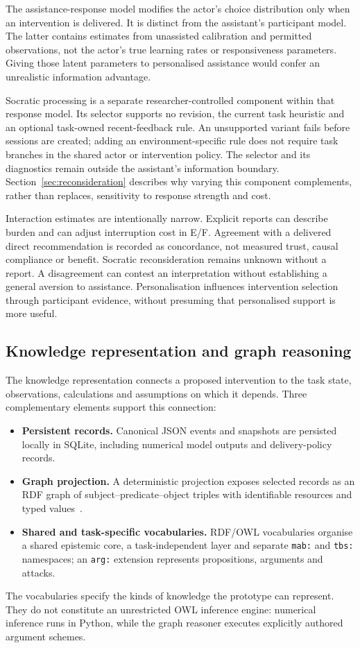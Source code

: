 \documentclass[11pt,a4paper]{article}
\begin{document}
The assistance-response model modifies the actor's choice distribution only when an intervention is delivered. It is distinct from the assistant's participant model. The latter contains estimates from unassisted calibration and permitted observations, not the actor's true learning rates or responsiveness parameters. Giving those latent parameters to personalised assistance would confer an unrealistic information advantage.

Socratic processing is a separate researcher-controlled component within that response model. Its selector supports no revision, the current task heuristic and an optional task-owned recent-feedback rule. An unsupported variant fails before sessions are created; adding an environment-specific rule does not require task branches in the shared actor or intervention policy. The selector and its diagnostics remain outside the assistant's information boundary. Section~\ref{sec:reconsideration} describes why varying this component complements, rather than replaces, sensitivity to response strength and cost.

Interaction estimates are intentionally narrow. Explicit reports can describe burden and can adjust interruption cost in E/F. Agreement with a delivered direct recommendation is recorded as concordance, not measured trust, causal compliance or benefit. Socratic reconsideration remains unknown without a report. A disagreement can contest an interpretation without establishing a general aversion to assistance. Personalisation influences intervention selection through participant evidence, without presuming that personalised support is more useful.

\subsection{Knowledge representation and graph reasoning}
\label{sec:knowledge-reasoning}
The knowledge representation connects a proposed intervention to the task state, observations, calculations and assumptions on which it depends. Three complementary elements support this connection:
\begin{itemize}
  \item \textbf{Persistent records.} Canonical JSON events and snapshots are persisted locally in SQLite, including numerical model outputs and delivery-policy records.
  \item \textbf{Graph projection.} A deterministic projection exposes selected records as an RDF graph of subject--predicate--object triples with identifiable resources and typed values~\cite{rdf}.
  \item \textbf{Shared and task-specific vocabularies.} RDF/OWL vocabularies organise a shared epistemic core, a task-independent layer and separate \texttt{mab:} and \texttt{tbs:} namespaces; an \texttt{arg:} extension represents propositions, arguments and attacks.
\end{itemize}
The vocabularies specify the kinds of knowledge the prototype can represent. They do not constitute an unrestricted OWL inference engine: numerical inference runs in Python, while the graph reasoner executes explicitly authored argument schemes.
\end{document}
